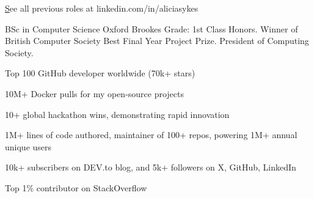 \documentclass[]{resume-format}
\begin{document}
    \vspace{-5mm}
    \begin{flushright}
        \small\color{lightgray} \href{ https://linkedin.com/in/aliciasykes }See all previous roles at linkedin.com/in/aliciasykes
    \end{flushright}





\begin{cventries}
    \cventry
    { BSc in Computer Science }
    { Oxford Brookes }
    {}
    {}
    {Grade: 1st Class Honors. Winner of British Computer Society Best Final Year Project Prize. President of Computing Society.}
\end{cventries}



\vspace{0.5mm}  %
\begin{cvskills}
\end{cvskills}




\vspace{0.5mm}
\begin{cvachievements}
\setlength{\itemsep}{0mm}
  \item { Top 100 GitHub developer worldwide (70k+ stars) \href{ https://gitstar-ranking.com/Lissy93 }{\scriptsize\color{lightgray}\faLink} }
  \item { 10M+ Docker pulls for my open-source projects \href{ https://hub.docker.com/u/lissy93 }{\scriptsize\color{lightgray}\faLink} }
  \item { 10+ global hackathon wins, demonstrating rapid innovation \href{ https://notes.aliciasykes.com/p/0s5s3uOtKj }{\scriptsize\color{lightgray}\faLink} }
  \item { 1M+ lines of code authored, maintainer of 100+ repos, powering 1M+ annual unique users \href{ https://codestats.net/users/alicia }{\scriptsize\color{lightgray}\faLink} }
  \item { 10k+ subscribers on DEV.to blog, and 5k+ followers on X, GitHub, LinkedIn \href{ https://dev.to/lissy93 }{\scriptsize\color{lightgray}\faLink} }
  \item { Top 1\% contributor on StackOverflow \href{ https://stackoverflow.com/users/979052/alicia-sykes }{\scriptsize\color{lightgray}\faLink} }
\end{cvachievements}
\end{document}

